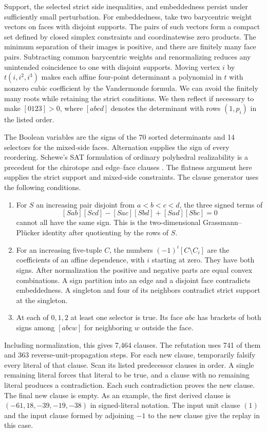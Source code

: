 \documentclass[11pt,letterpaper]{amsart}
\begin{document}
Support, the selected strict side inequalities, and embeddedness
persist under sufficiently small perturbation. For embeddedness,
take two barycentric weight vectors on faces with disjoint supports.
The pairs of such vectors form a compact set defined by closed simplex
constraints and coordinatewise zero products. The minimum separation
of their images is positive, and there are finitely many face pairs.
Subtracting common barycentric weights and renormalizing reduces any
unintended coincidence to one with disjoint supports. Moving
vertex \(i\) by \(t(i,i^2,i^3)\) makes each affine four-point
determinant a polynomial in \(t\) with nonzero cubic coefficient by
the Vandermonde formula. We can avoid the finitely many roots while
retaining the strict conditions. We then reflect if necessary to
make \([0123]>0\), where \([abcd]\) denotes the determinant with
rows \((1,p_i)\) in the listed order.

The Boolean variables are the signs of the 70 sorted determinants
and 14 selectors for the mixed-side faces. Alternation supplies the
sign of every reordering. Schewe's SAT formulation of ordinary
polyhedral realizability is a precedent for the chirotope and
edge--face clauses \cite[\S2.4]{schewe}. The flatness argument here
supplies the strict support and mixed-side constraints. The clause
generator uses the following conditions.

\begin{enumerate}
\item For \(S\) an increasing pair disjoint from \(a<b<c<d\), the
three signed terms of
\[
 [Sab][Scd]-[Sac][Sbd]+[Sad][Sbc]=0
\]
cannot all have the same sign. This is the two-dimensional
Grassmann--Pl\"ucker identity after quotienting by the rows of \(S\).
\item For an increasing five-tuple \(C\), the numbers
\((-1)^i[C\setminus C_i]\) are the coefficients of an affine
dependence, with \(i\) starting at zero. They have both signs.
After normalization the positive and negative parts are equal
convex combinations. A sign partition into an edge and a disjoint
face contradicts embeddedness. A singleton and four of its
neighbors contradict strict support at the singleton.
\item At each of \(0,1,2\) at least one selector is true. Its face
\(abc\) has brackets of both signs among \([abcw]\) for neighboring
\(w\) outside the face.
\end{enumerate}

Including normalization, this gives 7,464 clauses. The refutation
uses 741 of them and 363 reverse-unit-propagation steps. For each new
clause, temporarily falsify every literal of that clause. Scan its
listed predecessor clauses in order. A single remaining literal
forces that literal to be true, and a clause with no remaining
literal produces a contradiction. Each such contradiction proves the
new clause. The final new clause is empty. As an example, the first
derived clause is \((-61,18,-39,-19,-38)\) in signed-literal
notation. The input unit clause \((1)\) and the input clause formed
by adjoining \(-1\) to the new clause give the replay in this case.
\end{document}
